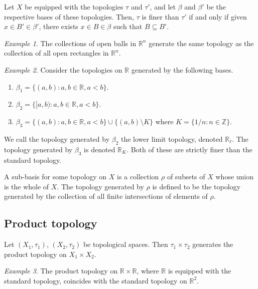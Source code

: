 \documentclass[11pt]{article}
\newcommand{\R}{\mathbb{R}}
\newcommand{\Z}{\mathbb{Z}}
\theoremstyle{definition}
\theoremstyle{remark}
\newtheorem*{example}{Example}
\numberwithin{equation}{section}
\begin{document}
    \begin{lemma}
        Let $X$ be equipped with the topologies $\tau$ and $\tau'$, and let $\beta$
        and $\beta'$ be the respective bases of these topologies. Then, $\tau$ is
        finer than $\tau'$ if and only if given $x \in B' \in \beta'$, there exists
        $x \in B \in \beta$ such that $B \subseteq B'$.
    \end{lemma}
    \begin{example}
        The collections of open balls in $\R^n$ generate the same topology as the
        collection of all open rectangles in $\R^n$.
    \end{example}
    \begin{example}
        Consider the topologies on $\R$ generated by the following bases.
        \begin{enumerate}
            \itemsep0em
            \item $\beta_1 = \{(a, b): a, b \in \R, a < b\}$.
            \item $\beta_2 = \{[a, b): a, b \in \R, a < b\}$.
            \item $\beta_3 = \{(a, b): a, b \in \R, a < b\} \cup \{(a, b) \setminus
            K\}$ where $K = \{1 / n: n \in \Z\}$.
        \end{enumerate}
        We call the topology generated by $\beta_2$ the lower limit topology, denoted
        $\R_\ell$. The topology generated by $\beta_3$ is denoted $\R_K$. Both of
        these are strictly finer than the standard topology.
    \end{example}

    \begin{definition}
        A sub-basis for some topology on $X$ is a collection $\rho$ of subsets of $X$
        whose union is the whole of $X$. The topology generated by $\rho$ is defined
        to be the topology generated by the collection of all finite intersections of
        elements of $\rho$.
    \end{definition}


    \subsection{Product topology}
    
    \begin{definition}
        Let $(X_1, \tau_1)$, $(X_2, \tau_2)$ be topological spaces. Then $\tau_1
        \times \tau_2$ generates the product topology on $X_1 \times X_2$.
    \end{definition}
    \begin{example}
        The product topology on $\R \times \R$, where $\R$ is equipped with the
        standard topology, coincides with the standard topology on $\R^2$.
    \end{example}
\end{document}
